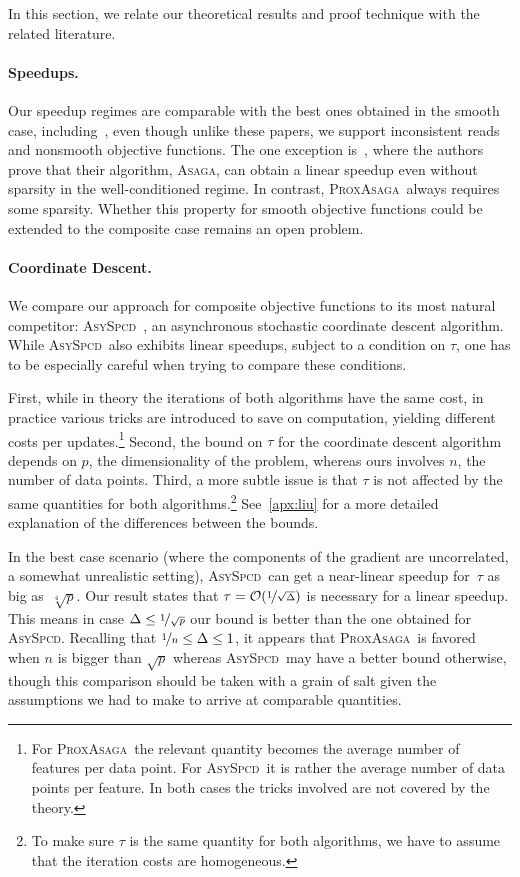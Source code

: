 \documentclass{article}
\newcommand{\PASAGA}{\textsc{ProxAsaga}}
\newcommand{\ASAGA}{\textsc{Asaga}}
\newcommand{\AsySPCD}{\textsc{AsySpcd}}
\begin{document}
In this section, we relate our theoretical results and proof technique with the related literature.

\paragraph{Speedups.}
Our speedup regimes are comparable with the best ones obtained in the smooth case, including~\citet{hogwild2011,reddi2015variance}, even though unlike these papers, we support inconsistent reads and nonsmooth objective functions.
The one exception is~\citet{leblond2016Asaga}, where the authors prove that their algorithm, \ASAGA, can obtain a linear speedup even without sparsity in the well-conditioned regime.
In contrast, \PASAGA\ always requires some sparsity.
Whether this property for smooth objective functions could be extended to the composite case remains an open problem.

\paragraph{Coordinate Descent.}
We compare our approach for composite objective functions to its most natural competitor: \AsySPCD~\citep{liu2015asynchronous2}, an asynchronous stochastic coordinate descent algorithm.
While \AsySPCD\ also exhibits linear speedups, subject to a condition on $\tau$, one has to be especially careful when trying to compare these conditions.

First, while in theory the iterations of both algorithms have the same cost, in practice various tricks are introduced to save on computation, yielding different costs per updates.\footnote{For \PASAGA\ the relevant quantity becomes the average number of features per data point. For \AsySPCD\ it is rather the average number of data points per feature. In both cases the tricks involved are not covered by the theory.}
Second, the bound on $\tau$ for the coordinate descent algorithm depends on $p$, the dimensionality of the problem, whereas ours involves $n$, the number of data points.
Third, a more subtle issue is that $\tau$ is not affected by the same quantities for both algorithms.\footnote{To make sure $\tau$ is the same quantity for both algorithms, we have to assume that the iteration costs are homogeneous.}
%
See~\ref{apx:liu} for a more detailed explanation of the differences between the bounds.

In the best case scenario (where the components of the gradient are uncorrelated, a somewhat unrealistic setting), \AsySPCD\ can get a near-linear speedup for~$\tau$ as big as~$\sqrt[4]{p}$.
Our result states that $\tau = \mathcal{O}(\nicefrac{1}{\sqrt{\Delta}})$ is necessary for a linear speedup.
%
%
This means in case $\Delta \leq \nicefrac{1}{\sqrt{p}}$ our bound is better than the one obtained for \AsySPCD.
%
Recalling that $\nicefrac{1}{n} \leq \Delta \leq 1$, it appears that \PASAGA\ is favored when $n$ is bigger than $\sqrt{p}$ whereas \AsySPCD\ may have a better bound otherwise, though this comparison should be taken with a grain of salt given the assumptions we had to make to arrive at comparable quantities.
\end{document}
